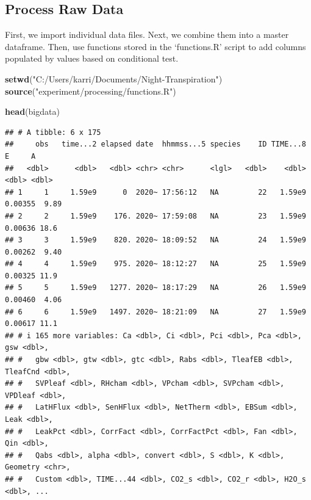 \documentclass[
]{article}
\newenvironment{Shaded}{\begin{snugshade}}{\end{snugshade}}
\newcommand{\FunctionTok}[1]{\textcolor[rgb]{0.13,0.29,0.53}{\textbf{#1}}}
\newcommand{\NormalTok}[1]{#1}
\newcommand{\StringTok}[1]{\textcolor[rgb]{0.31,0.60,0.02}{#1}}
\begin{document}
\hypertarget{process-raw-data}{%
\subsection{Process Raw Data}\label{process-raw-data}}

First, we import individual data files. Next, we combine them into a
master dataframe. Then, use functions stored in the `functions.R' script
to add columns populated by values based on conditional test.

\begin{Shaded}
\begin{Highlighting}[]
\FunctionTok{setwd}\NormalTok{(}\StringTok{"C:/Users/karri/Documents/Night{-}Transpiration"}\NormalTok{)}
\FunctionTok{source}\NormalTok{(}\StringTok{"experiment/processing/functions.R"}\NormalTok{)}
\end{Highlighting}
\end{Shaded}

\begin{Shaded}
\begin{Highlighting}[]
\FunctionTok{head}\NormalTok{(bigdata)}
\end{Highlighting}
\end{Shaded}

\begin{verbatim}
## # A tibble: 6 x 175
##     obs   time...2 elapsed date  hhmmss...5 species    ID TIME...8       E     A
##   <dbl>      <dbl>   <dbl> <chr> <chr>      <lgl>   <dbl>    <dbl>   <dbl> <dbl>
## 1     1     1.59e9      0  2020~ 17:56:12   NA         22   1.59e9 0.00355  9.89
## 2     2     1.59e9    176. 2020~ 17:59:08   NA         23   1.59e9 0.00636 18.6 
## 3     3     1.59e9    820. 2020~ 18:09:52   NA         24   1.59e9 0.00262  9.40
## 4     4     1.59e9    975. 2020~ 18:12:27   NA         25   1.59e9 0.00325 11.9 
## 5     5     1.59e9   1277. 2020~ 18:17:29   NA         26   1.59e9 0.00460  4.06
## 6     6     1.59e9   1497. 2020~ 18:21:09   NA         27   1.59e9 0.00617 11.1 
## # i 165 more variables: Ca <dbl>, Ci <dbl>, Pci <dbl>, Pca <dbl>, gsw <dbl>,
## #   gbw <dbl>, gtw <dbl>, gtc <dbl>, Rabs <dbl>, TleafEB <dbl>, TleafCnd <dbl>,
## #   SVPleaf <dbl>, RHcham <dbl>, VPcham <dbl>, SVPcham <dbl>, VPDleaf <dbl>,
## #   LatHFlux <dbl>, SenHFlux <dbl>, NetTherm <dbl>, EBSum <dbl>, Leak <dbl>,
## #   LeakPct <dbl>, CorrFact <dbl>, CorrFactPct <dbl>, Fan <dbl>, Qin <dbl>,
## #   Qabs <dbl>, alpha <dbl>, convert <dbl>, S <dbl>, K <dbl>, Geometry <chr>,
## #   Custom <dbl>, TIME...44 <dbl>, CO2_s <dbl>, CO2_r <dbl>, H2O_s <dbl>, ...
\end{verbatim}
\end{document}
